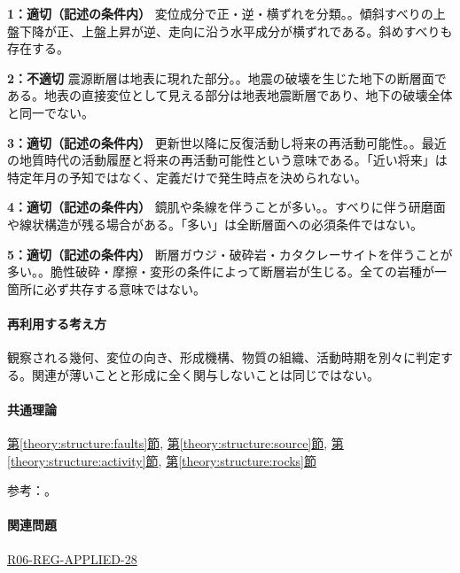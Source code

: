 \noindent\textbf{1：適切（記述の条件内）} 変位成分で正・逆・横ずれを分類。。傾斜すべりの上盤下降が正、上盤上昇が逆、走向に沿う水平成分が横ずれである。斜めすべりも存在する。\par

\noindent\textbf{2：不適切} 震源断層は地表に現れた部分。。地震の破壊を生じた地下の断層面である。地表の直接変位として見える部分は地表地震断層であり、地下の破壊全体と同一でない。\par

\noindent\textbf{3：適切（記述の条件内）} 更新世以降に反復活動し将来の再活動可能性。。最近の地質時代の活動履歴と将来の再活動可能性という意味である。「近い将来」は特定年月の予知ではなく、定義だけで発生時点を決められない。\par

\noindent\textbf{4：適切（記述の条件内）} 鏡肌や条線を伴うことが多い。。すべりに伴う研磨面や線状構造が残る場合がある。「多い」は全断層面への必須条件ではない。\par

\noindent\textbf{5：適切（記述の条件内）} 断層ガウジ・破砕岩・カタクレーサイトを伴うことが多い。。脆性破砕・摩擦・変形の条件によって断層岩が生じる。全ての岩種が一箇所に必ず共存する意味ではない。\par

\paragraph{再利用する考え方} 観察される幾何、変位の向き、形成機構、物質の組織、活動時期を別々に判定する。関連が薄いことと形成に全く関与しないことは同じではない。

\paragraph{共通理論} \hyperref[theory:structure:faults]{第\ref*{theory:structure:faults}節}, \hyperref[theory:structure:source]{第\ref*{theory:structure:source}節}, \hyperref[theory:structure:activity]{第\ref*{theory:structure:activity}節}, \hyperref[theory:structure:rocks]{第\ref*{theory:structure:rocks}節}

\par 参考：\cite{str_source,str_faultrocks,str_activity}。

\paragraph{関連問題} \hyperref[q:r06-reg-applied-28]{R06-REG-APPLIED-28}

